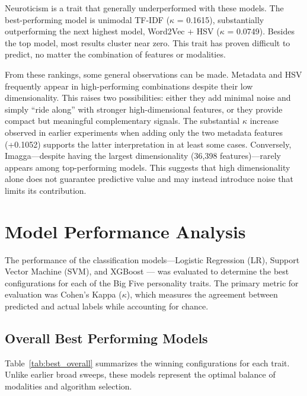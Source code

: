 Neuroticism is a trait that generally underperformed with these models. The best-performing model is unimodal TF-IDF ($\kappa$ = 0.1615), substantially outperforming the next highest model, Word2Vec + HSV ($\kappa$ = 0.0749). Besides the top model, most results cluster near zero. This trait has proven difficult to predict, no matter the combination of features or modalities.

From these rankings, some general observations can be made. Metadata and HSV frequently appear in high-performing combinations despite their low dimensionality. This raises two possibilities: either they add minimal noise and simply “ride along” with stronger high-dimensional features, or they provide compact but meaningful complementary signals. The substantial $\kappa$ increase observed in earlier experiments when adding only the two metadata features (+0.1052) supports the latter interpretation in at least some cases. Conversely, Imagga—despite having the largest dimensionality (36,398 features)—rarely appears among top-performing models. This suggests that high dimensionality alone does not guarantee predictive value and may instead introduce noise that limits its contribution. 


\section{Model Performance Analysis}
The performance of the classification models—Logistic Regression (LR), Support Vector Machine (SVM), and XGBoost — was evaluated to determine the best configurations for each of the Big Five personality traits. The primary metric for evaluation was Cohen’s Kappa ($\kappa$), which measures the agreement between predicted and actual labels while accounting for chance.

\subsection{Overall Best Performing Models}
Table~\ref{tab:best_overall} summarizes the winning configurations for each trait. Unlike earlier broad sweeps, these models represent the optimal balance of modalities and algorithm selection.


